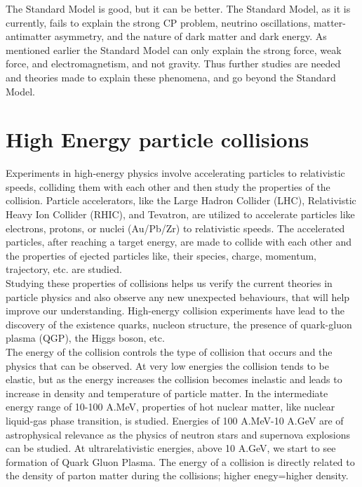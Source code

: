 \documentclass[12pt,a4paper,twoside]{report}
\begin{document}
The Standard Model is good, but it can be better. The Standard Model, as it  is currently, fails to explain the strong CP problem, neutrino oscillations, matter-antimatter asymmetry, and the nature of dark matter and dark energy.%
As mentioned earlier the Standard Model can only explain the strong force, weak force, and electromagnetism, and not gravity. Thus further studies are needed and theories made to explain these phenomena, and go beyond the Standard Model.\\
\section{High Energy particle collisions}
Experiments in high-energy physics involve accelerating particles to relativistic speeds, colliding them with each other and then study the properties of the collision. Particle accelerators, like the Large Hadron Collider (LHC), Relativistic Heavy Ion Collider (RHIC), and Tevatron, are utilized to accelerate particles like electrons, protons, or nuclei (Au/Pb/Zr) to relativistic speeds. The accelerated particles, after reaching a target energy, are made to collide with each other and the properties of ejected particles like, their species, charge, momentum, trajectory, etc. are studied.\\
Studying these properties of collisions helps us verify the current theories in particle physics and also observe any new unexpected behaviours, that will help improve our understanding. High-energy collision experiments have lead to the discovery of the existence quarks, nucleon structure, the presence of quark-gluon plasma (QGP), the Higgs boson, etc.\\
The energy of the collision controls the type of collision that occurs and the physics that can be observed. At very low energies the collision tends to be elastic, but as the energy increases the collision becomes inelastic and leads to increase in density and temperature of particle matter. In the intermediate energy range of 10-100 A.MeV, properties of hot nuclear matter, like nuclear liquid-gas phase transition, is studied. Energies of 100 A.MeV-10 A.GeV are of astrophysical relevance as the physics of neutron stars and supernova explosions can be studied. At ultrarelativistic energies, above 10 A.GeV, we start to see formation of Quark Gluon Plasma. The energy of a collision is directly related to the density of parton matter during the collisions; higher enegy=higher density.\\
\end{document}
